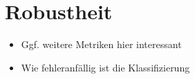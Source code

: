 \section{Robustheit}\label{sec:robustheit}

\begin{itemize}
    \item Ggf. weitere Metriken hier interessant
    \item Wie fehleranfällig ist die Klassifizierung
\end{itemize}